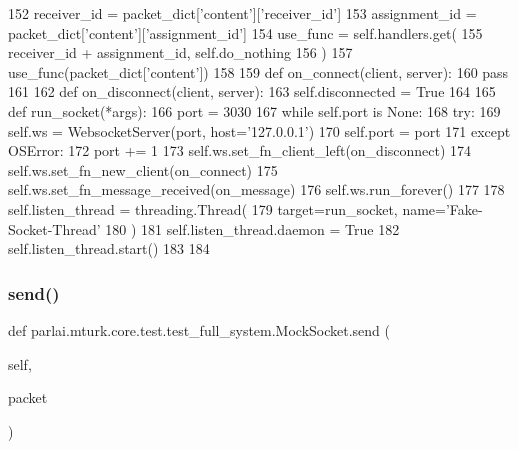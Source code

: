 \begin{DoxyCode}
152                 receiver\_id = packet\_dict[\textcolor{stringliteral}{'content'}][\textcolor{stringliteral}{'receiver\_id'}]
153                 assignment\_id = packet\_dict[\textcolor{stringliteral}{'content'}][\textcolor{stringliteral}{'assignment\_id'}]
154                 use\_func = self.handlers.get(
155                     receiver\_id + assignment\_id, self.do\_nothing
156                 )
157                 use\_func(packet\_dict[\textcolor{stringliteral}{'content'}])
158 
159         \textcolor{keyword}{def }on\_connect(client, server):
160             \textcolor{keywordflow}{pass}
161 
162         \textcolor{keyword}{def }on\_disconnect(client, server):
163             self.disconnected = \textcolor{keyword}{True}
164 
165         \textcolor{keyword}{def }run\_socket(*args):
166             port = 3030
167             \textcolor{keywordflow}{while} self.port \textcolor{keywordflow}{is} \textcolor{keywordtype}{None}:
168                 \textcolor{keywordflow}{try}:
169                     self.ws = WebsocketServer(port, host=\textcolor{stringliteral}{'127.0.0.1'})
170                     self.port = port
171                 \textcolor{keywordflow}{except} OSError:
172                     port += 1
173             self.ws.set\_fn\_client\_left(on\_disconnect)
174             self.ws.set\_fn\_new\_client(on\_connect)
175             self.ws.set\_fn\_message\_received(on\_message)
176             self.ws.run\_forever()
177 
178         self.listen\_thread = threading.Thread(
179             target=run\_socket, name=\textcolor{stringliteral}{'Fake-Socket-Thread'}
180         )
181         self.listen\_thread.daemon = \textcolor{keyword}{True}
182         self.listen\_thread.start()
183 
184 
\end{DoxyCode}
\mbox{\label{classparlai_1_1mturk_1_1core_1_1test_1_1test__full__system_1_1MockSocket_adfde729d82337cbb4bd1757c18fe92f6}} 
\subsubsection{\texorpdfstring{send()}{send()}}
{\footnotesize\ttfamily def parlai.\+mturk.\+core.\+test.\+test\+\_\+full\+\_\+system.\+Mock\+Socket.\+send (\begin{DoxyParamCaption}\item[{}]{self,  }\item[{}]{packet }\end{DoxyParamCaption})}



